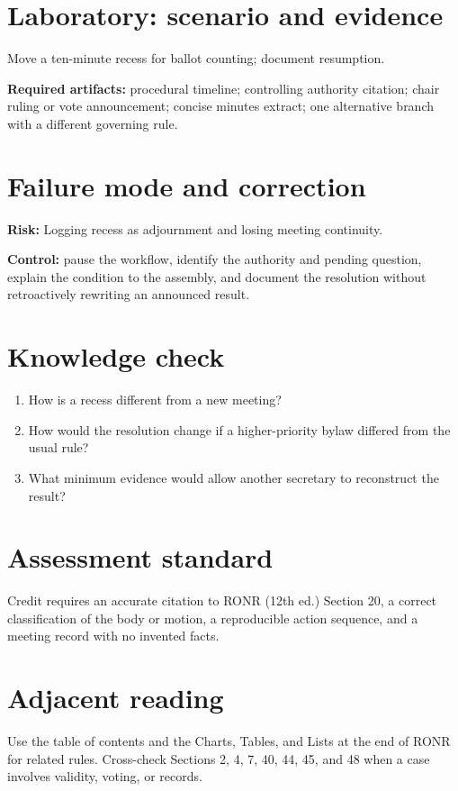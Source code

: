 \documentclass[11pt]{article}
\begin{document}
\section{Laboratory: scenario and evidence}
Move a ten-minute recess for ballot counting; document resumption.

\textbf{Required artifacts:} procedural timeline; controlling authority citation; chair ruling or vote announcement; concise minutes extract; one alternative branch with a different governing rule.

\section{Failure mode and correction}
\textbf{Risk:} Logging recess as adjournment and losing meeting continuity.

\textbf{Control:} pause the workflow, identify the authority and pending question, explain the condition to the assembly, and document the resolution without retroactively rewriting an announced result.

\section{Knowledge check}
\begin{enumerate}[leftmargin=*,itemsep=4pt]
\item How is a recess different from a new meeting?
\item How would the resolution change if a higher-priority bylaw differed from the usual rule?
\item What minimum evidence would allow another secretary to reconstruct the result?
\end{enumerate}

\section{Assessment standard}
Credit requires an accurate citation to RONR (12th ed.) Section 20, a correct classification of the body or motion, a reproducible action sequence, and a meeting record with no invented facts.

\section{Adjacent reading}
Use the table of contents and the Charts, Tables, and Lists at the end of RONR for related rules. Cross-check Sections 2, 4, 7, 40, 44, 45, and 48 when a case involves validity, voting, or records.
\end{document}
